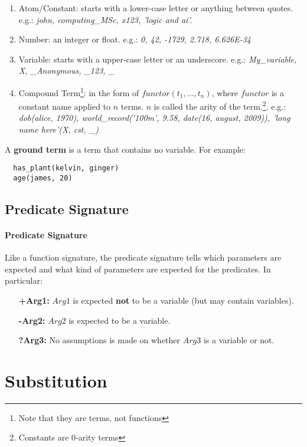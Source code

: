 \documentclass{article}
\begin{document}
\begin{multicols}{2}
  \begin{enumerate}
  \item Atom/Constant: starts with a lower-case letter or anything between quotes. e.g.: \textit{john, computing\_MSc, x123, 'logic and ai'.}
  \item Number: an integer or float. e.g.: \textit{0, 42, -1729, 2.718, 6.626E-34}
  \item Variable: starts with a upper-case letter or an underscore. e.g.: \textit{My\_variable, X, \_Anonymous, \_123, \_} 
  \item Compound Term\footnote{Note that they are terms, not functions}: in the form of $functor(t_1,..., t_n)$, where $functor$ is a constant name applied to $n$ terms. $n$ is called the arity of the term.\footnote{Constants are 0-arity terms}. e.g.: \textit{dob(alice, 1970), world\_record('100m', 9.58, date(16, august, 2009)), 'long name here'(X, cst, \_)}
  \end{enumerate}
  
  \noindent A {\bf ground term} is a term that contains no variable. For example:
  
  \begin{lstlisting}
  has_plant(kelvin, ginger)
  age(james, 20)
  \end{lstlisting}
  
  \subsection{Predicate Signature}
  
  \paragraph{Predicate Signature} Like a function signature, the predicate signature tells which parameters are expected and what kind of parameters are expected for the predicates. In particular:
  
  \begin{enumerate}
  \item[\bf +Arg1:] $Arg1$ is expected {\bf not} to be a variable (but may contain variables).
  \item[\bf -Arg2:] $Arg2$ is expected to be a variable.
  \item[\bf ?Arg3:] No assumptions is made on whether $Arg3$ is a variable or not.
  \end{enumerate}
  
  \section{Substitution}
  

\end{multicols}
\end{document}
